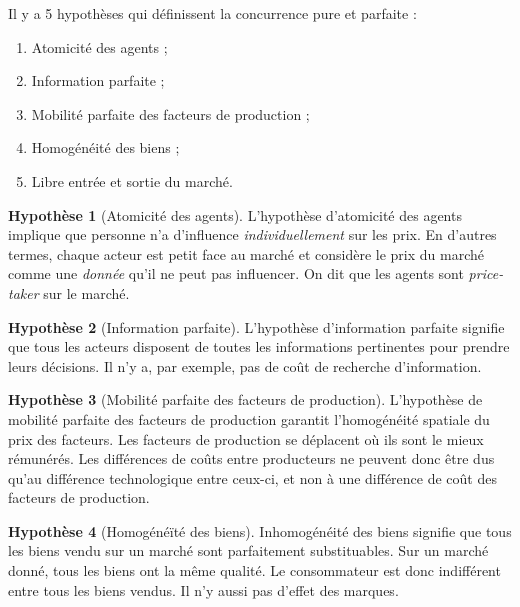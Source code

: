 \documentclass[
]{book}
\providecommand{\tightlist}{%
  \setlength{\itemsep}{0pt}\setlength{\parskip}{0pt}}
\theoremstyle{definition}
\theoremstyle{definition}
\theoremstyle{definition}
\theoremstyle{definition}
\newtheorem{hypothesis}{Hypothèse}[chapter]
\theoremstyle{remark}
\begin{document}

Il y a 5 hypothèses qui définissent la concurrence pure et parfaite :

\begin{enumerate}
\def\labelenumi{\arabic{enumi}.}
\tightlist
\item
  Atomicité des agents ;
\item
  Information parfaite ;
\item
  Mobilité parfaite des facteurs de production ;
\item
  Homogénéité des biens ;
\item
  Libre entrée et sortie du marché.
\end{enumerate}

\begin{hypothesis}[Atomicité des agents]
L'hypothèse d'atomicité des agents implique que personne n'a d'influence \emph{individuellement} sur les prix.
En d'autres termes, chaque acteur est petit face au marché et considère le prix du marché comme une \emph{donnée} qu'il ne peut pas influencer.
On dit que les agents sont \emph{price-taker} sur le marché.
\end{hypothesis}

\begin{hypothesis}[Information parfaite]
L'hypothèse d'information parfaite signifie que tous les acteurs disposent de toutes les informations pertinentes pour prendre leurs décisions.
Il n'y a, par exemple, pas de coût de recherche d'information.
\end{hypothesis}

\begin{hypothesis}[Mobilité parfaite des facteurs de production]
L'hypothèse de mobilité parfaite des facteurs de production garantit l'homogénéité spatiale du prix des facteurs.
Les facteurs de production se déplacent où ils sont le mieux rémunérés.
Les différences de coûts entre producteurs ne peuvent donc être dus qu'au différence technologique entre ceux-ci, et non à une différence de coût des facteurs de production.
\end{hypothesis}

\begin{hypothesis}[Homogénéïté des biens]
Inhomogénéité des biens signifie que tous les biens vendu sur un marché sont parfaitement substituables.
Sur un marché donné, tous les biens ont la même qualité.
Le consommateur est donc indifférent entre tous les biens vendus.
Il n'y aussi pas d'effet des marques.
\end{hypothesis}
\end{document}
